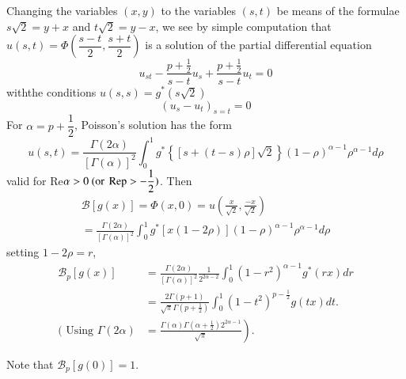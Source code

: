  Changing the variables $(x, y)$ to the variables $(s, t)$ be means of
 the formulae  $s \sqrt{2} = y + x$ and $t \sqrt{2} = y - x$, we see
 by simple computation that $u ( s, t  ) = \Phi \left(\dfrac{s - t}{2},
 \dfrac{s + t}{2}\right)$ is a solution of the partial differential equation  
 $$
 u_{st} - \frac{p + \frac{1}{2} }{s - t}u_s + \frac{p + \frac{1}{2}}{s
   - t }  u_t = 0 
 $$
 with\pageoriginale the conditions $u(s, s) = g^* (s \sqrt{2})$
 $$
 (u_s - u_t ) _{ s = t} = 0 
 $$\eject
 For $\alpha = p + \dfrac{1}{2}$, Poisson's solution has the form 
 $$
 u (s, t ) = \frac{\Gamma (2 \alpha)}{ [ \Gamma (\alpha)]^2} \int^1_0
 g^* \left\{ [ s + (t - s )\rho ]\sqrt{2}\right\} (1 - \rho)^{\alpha -
   1 }\rho ^{ \alpha - 1} d \rho  
 $$
 valid for Re$ \alpha > 0 ~(\text{or}~ \operatorname{Rep}> - \dfrac{1}{2})$.
Then 
\begin{multline*}
     \mathscr{B} [ g(x)] = \Phi (x, 0)  = u
   (\frac{x}{\sqrt{2}}, \frac{- x}{\sqrt{2}})\\
   = \frac{\Gamma (2 \alpha )}{[ \Gamma(\alpha )]^2} \int^1_0 g^* [ x
     (1 - 2 \rho )] (1 - \rho )^{ \alpha - 1} \rho^{\alpha - 1 } d
   \rho  
\end{multline*}
 setting $1 - 2 \rho = r $, 
 \begin{align*}
   \mathscr{B}_p [ g (x) ] &= \frac{\Gamma (2 \alpha )}{[ \Gamma
       (\alpha) ]^2 }  \frac{1}{2^{ 2 \alpha - 2 }} \int_0^1 (1 - r^
   2)^{\alpha - 1} g^* (rx) dr \\ 
   & = \frac{2 \Gamma ( p + 1)}{\sqrt{\pi} \Gamma (p +
     \frac{1}{2})}\int_0^1 (1 - t^2 )^{ p - \frac{1}{2}} g (tx)
   dt. \\ 
   (\text{ Using } \Gamma (2 \alpha ) & = \left.\frac{\Gamma (\alpha )\Gamma (
     \alpha +\frac{1}{2})2^{ 2 \alpha - 1 }}{\sqrt{\pi}} \right). 
 \end{align*}

Note that $\mathscr{B} _ p [ g (0)] = 1$. 

